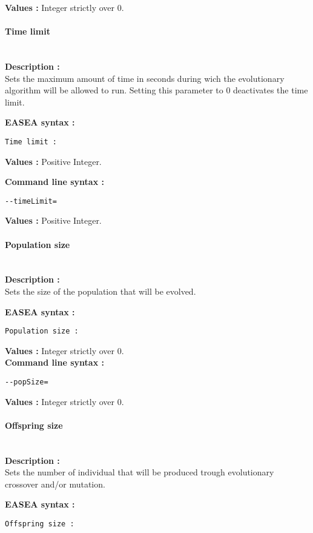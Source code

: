 \documentclass{book}
\begin{document}
\textbf{Values :} Integer strictly over 0.

\paragraph{Time limit}\label{time-limit}
~\\

\textbf{Description :}\\Sets the maximum amount of time in seconds
during wich the evolutionary algorithm will be allowed to run. Setting
this parameter to 0 deactivates the time limit.

\textbf{EASEA syntax :}

\texttt{Time~limit~:}

\textbf{Values :} Positive Integer.

\textbf{Command line syntax :}

\texttt{-{}-timeLimit=}

\textbf{Values :} Positive Integer.

\paragraph{Population size}\label{population-size}
~\\

\textbf{Description :}\\Sets the size of the population that will be
evolved.

\textbf{EASEA syntax :}

\texttt{Population~size~:}

\textbf{Values :} Integer strictly over 0.\\ \textbf{Command line syntax
:}

\texttt{-{}-popSize=}

\textbf{Values :} Integer strictly over 0.\\

\paragraph{Offspring size}\label{offspring-size}
~\\

\textbf{Description :}\\Sets the number of individual that will be
produced trough evolutionary crossover and/or mutation.

\textbf{EASEA syntax :}

\texttt{Offspring~size~:}
\end{document}
